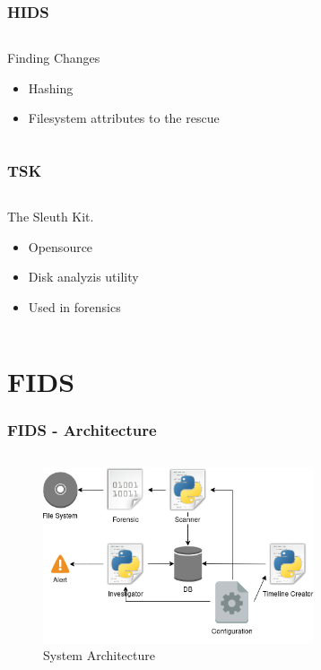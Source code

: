 \documentclass{beamer}
\begin{document}
\begin{frame}[fragile]
  \frametitle{HIDS}
  \begin{columns}
    \begin{column}{1\textwidth}
      Finding Changes
      \begin{itemize}
        \item Hashing
        \item Filesystem attributes to the rescue
      \end{itemize}
    \end{column}
  \end{columns}
\end{frame}

\begin{frame}[fragile]
  \frametitle{TSK}
  \begin{columns}
    \begin{column}{1\textwidth}
      The Sleuth Kit.
      \begin{itemize}
        \item Opensource
        \item Disk analyzis utility
        \item Used in forensics
      \end{itemize}
    \end{column}
  \end{columns}
\end{frame}

\section{FIDS}


\begin{frame}[fragile]
  \frametitle{FIDS - Architecture}
  \begin{columns}
    \begin{column}{1\textwidth}
      \begin{figure}[ht]
        \includegraphics[width=8cm]{../img/Overview_FIDS.png}
        \centering
        \caption{System Architecture}
        \label{fig:systemArchitecture}
      \end{figure}
    \end{column}
  \end{columns}
\end{frame}
\end{document}
